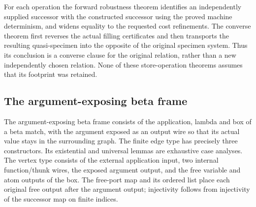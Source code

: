 For each operation the forward robustness theorem identifies an independently supplied successor with the constructed successor using the proved machine determinism, and widens equality to the requested cost refinements. The converse theorem first reverses the actual filling certificates and then transports the resulting quasi-specimen into the opposite of the original specimen system. Thus its conclusion is a converse clause for the original relation, rather than a new independently chosen relation. None of these store-operation theorems assumes that its footprint was retained.
\par{}
\par{}
\par{}

\subsection{The argument-exposing beta frame}
The argument-exposing beta frame consists of the application, lambda and box of a beta match, with the argument exposed as an output wire so that its actual value stays in the surrounding graph.
The finite edge type has precisely three constructors. Its existential and universal lemmas are exhaustive case analyses. The vertex type consists of the external application input, two internal function/thunk wires, the exposed argument output, and the free variable and atom outputs of the box. The free-port map and its ordered list place each original free output after the argument output; injectivity follows from injectivity of the successor map on finite indices.

